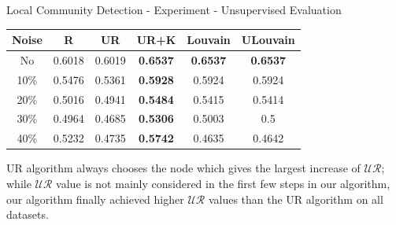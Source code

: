 \documentclass[9pt]{beamer}
\begin{document}
\begin{frame}{Local Community Detection - Experiment - Unsupervised Evaluation}
\begin{table}[h]
\centering
\label{unsupervised_synthetic}
\begin{tabular}{c|c|c|c|c|c}
\hline
Noise & R      & UR     & UR+K            & Louvain         & ULouvain        \\ \hline
No    & 0.6018 & 0.6019 & \textbf{0.6537} & \textbf{0.6537} & \textbf{0.6537} \\ \hline
10\%  & 0.5476 & 0.5361 & \textbf{0.5928} & 0.5924          & 0.5924          \\ \hline
20\%  & 0.5016 & 0.4941 & \textbf{0.5484} & 0.5415          & 0.5414          \\ \hline
30\%  & 0.4964 & 0.4685 & \textbf{0.5306} & 0.5003          & 0.5             \\ \hline
40\%  & 0.5232 & 0.4735 & \textbf{0.5742} & 0.4635          & 0.4642          \\ \hline
\end{tabular}
\end{table}
\small
UR algorithm always chooses the node which gives the largest increase of $\mathcal{UR}$; while $\mathcal{UR}$ value is not mainly considered in the first few steps in our algorithm, our algorithm finally achieved higher $\mathcal{UR}$ values than the UR algorithm on all datasets.
\end{frame}
\end{document}
